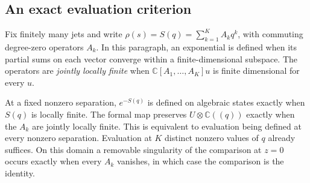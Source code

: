 \subsection{An exact evaluation criterion}

Fix finitely many jets and write \(\rho(s)=S(q)=\sum_{k=1}^KA_kq^k\), with
commuting degree-zero operators \(A_k\). In this paragraph, an exponential
is defined when its partial sums on each vector converge within a
finite-dimensional subspace. The operators are \emph{jointly locally finite}
when \(\mathbb C[A_1,\ldots,A_K]u\) is finite dimensional for every \(u\).

\begin{proposition}
\label{v4-arith:cs:prop:evaluation}
At a fixed nonzero separation, \(e^{-S(q)}\) is defined on algebraic states
exactly when \(S(q)\) is locally finite. The formal map preserves
\(U\otimes\mathbb C((q))\) exactly when the \(A_k\) are jointly locally
finite. This is equivalent to evaluation being defined at every nonzero
separation. Evaluation at \(K\) distinct nonzero values of \(q\) already
suffices. On this domain a removable singularity of the comparison at
\(z=0\) occurs exactly when every \(A_k\) vanishes, in which case the
comparison is the identity.
\end{proposition}

